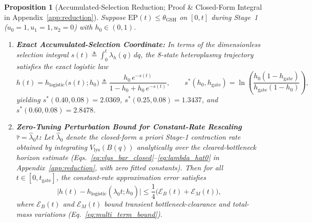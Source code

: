 \documentclass[11pt]{article}
\theoremstyle{plain}
\newtheorem{proposition}{Proposition}
\theoremstyle{remark}
\begin{document}
\begin{proposition}[Accumulated-Selection Reduction; Proof \& Closed-Form Integral in Appendix~\ref{app:reduction}]
\label{prop:reduction}
Suppose $\mathrm{EP}(t) \le \theta_{\mathrm{GSH}}$ on $[0, t]$ during Stage~1 ($u_0=1, u_1=1, u_2=0$) with $h_0 \in (0, 1)$.
\begin{enumerate}
  \item \textbf{Exact Accumulated-Selection Coordinate:} In terms of the dimensionless selection integral $s(t) \triangleq \int_0^t \lambda_h(q)\,dq$, the 8-state heteroplasmy trajectory satisfies the exact logistic law
  \begin{equation}
    h(t) = h_{\mathrm{logistic}}\big(s(t); h_0\big) \triangleq \frac{h_0\,e^{-s(t)}}{1 - h_0 + h_0\,e^{-s(t)}}, \qquad s^*(h_0, h_{\mathrm{gate}}) = \ln\!\left(\frac{h_0(1 - h_{\mathrm{gate}})}{h_{\mathrm{gate}}(1 - h_0)}\right),
    \label{eq:h_logistic_exact}
  \end{equation}
  yielding $s^*(0.40, 0.08) = 2.0369$, $s^*(0.25, 0.08) = 1.3437$, and $s^*(0.60, 0.08) = 2.8478$.
  \item \textbf{Zero-Tuning Perturbation Bound for Constant-Rate Rescaling $\hat{\tau} = \hat{\lambda}_0 t$:} Let $\hat{\lambda}_0$ denote the closed-form \textit{a priori} Stage-1 contraction rate obtained by integrating $V_{\mathrm{lys}}(B(q))$ analytically over the cleared-bottleneck horizon estimate (Eqs.~\ref{eq:vlys_bar_closed}--\ref{eq:lambda_hat0} in Appendix~\ref{app:reduction}, with zero fitted constants). Then for all $t \in [0, t_{\mathrm{gate}}]$, the constant-rate approximation error satisfies
  \begin{equation}
    \big|h(t) - h_{\mathrm{logistic}}(\hat{\lambda}_0 t; h_0)\big| \le \frac{1}{4}\Big(\mathcal{E}_B(t) + \mathcal{E}_M(t)\Big),
    \label{eq:sup_err_bound}
  \end{equation}
  where $\mathcal{E}_B(t)$ and $\mathcal{E}_M(t)$ bound transient bottleneck-clearance and total-mass variations (Eq.~\ref{eq:multi_term_bound}).
\end{enumerate}
\end{proposition}
\end{document}
